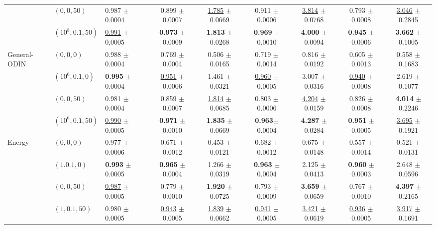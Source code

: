 \begin{table}[htb]
\begin{adjustbox}{width=1\textwidth,center}
\begin{tabular}{l|l|l|c|c|c|c|c|c}
			& $(0, 0, 50)$ & 0.987 $\pm$ 0.0004 & 0.899 $\pm$ 0.0007 & \underline{1.785} $\pm$ 0.0669 & 0.911 $\pm$ 0.0006 & \underline{3.814} $\pm$ 0.0768 & 0.793 $\pm$ 0.0008 & \underline{3.046} $\pm$ 0.2845\\
			& $(10^8, 0.1, 50)$ & \underline{0.991} $\pm$ 0,0005 & \textbf{0.973} $\pm$ 0.0009 & \textbf{1.813} $\pm$ 0.0268 & \textbf{0.969} $\pm$ 0.0010 & \textbf{4.000} $\pm$ 0.0094 & \textbf{0.945} $\pm$ 0.0006 & \textbf{3.662} $\pm$ 0.1005\\ \hline
            \multirow{4}{0.10\linewidth}{General-ODIN} 
			& $(0, 0, 0)$ & 0.988 $\pm$ 0.0004 & 0.769 $\pm$ 0.0004 & 0.506 $\pm$ 0.0165 & 0.719 $\pm$ 0.0014 & 0.816 $\pm$ 0.0192 & 0.605 $\pm$ 0.0013 & 0.558 $\pm$ 0.1683\\
			& $(10^6, 0.1, 0)$ & \textbf{0.995} $\pm$ 0.0004 & \underline{0.951} $\pm$ 0.0006 & 1.461 $\pm$ 0.0321 & \underline{0.960} $\pm$ 0.0005 & 3.007 $\pm$ 0.0316 & \underline{0.940} $\pm$ 0.0008 & 2.619 $\pm$ 0.1077\\
			& $(0, 0, 50)$ & 0.981 $\pm$ 0.0004 & 0.859 $\pm$ 0.0007 & \underline{1.814} $\pm$ 0.0685 & 0.803 $\pm$ 0.0006 & \underline{4.204} $\pm$ 0.0159 & 0.826 $\pm$ 0.0008 & \textbf{4.014} $\pm$ 0.2246\\
			& $(10^6, 0.1, 50)$ & \underline{0.990} $\pm$ 0.0005 & \textbf{0.971} $\pm$ 0.0010 & \textbf{1.835} $\pm$ 0.0669 & \textbf{0.963}$\pm$ 0.0004 & \textbf{4.287} $\pm$ 0.0284 & \textbf{0.951} $\pm$ 0.0005 & \underline{3.695} $\pm$ 0.1921 \\ \hline
            \multirow{4}{0.10\linewidth}{Energy} 
			& $(0, 0, 0)$ & 0.977 $\pm$ 0.0006 & 0.671 $\pm$ 0.0012 & 0.453 $\pm$ 0.0121 & 0.682 $\pm$ 0.0012 & 0.675 $\pm$ 0.0148 & 0.557 $\pm$ 0.0014 & 0.521 $\pm$ 0.0131\\
			& $(1. 0.1, 0)$ & \textbf{0.993} $\pm$ 0.0005 & \textbf{0.965} $\pm$ 0.0004 & 1.266 $\pm$ 0.0319 & \textbf{0.963} $\pm$ 0.0004 & 2.125 $\pm$ 0.0413 & \textbf{0.960} $\pm$ 0.0003 & 2.648 $\pm$ 0.0596\\
			& $(0, 0, 50)$ & \underline{0.987} $\pm$ 0.0005 & 0.779 $\pm$ 0.0010 & \textbf{1.920} $\pm$ 0.0725 & 0.793 $\pm$ 0.0009 & \textbf{3.659} $\pm$ 0.0659 & 0.767 $\pm$ 0.0010 & \textbf{4.397} $\pm$ 0.2165 \\
			& $(1, 0.1, 50)$ & 0.980 $\pm$ 0.0005 & \underline{0.943} $\pm$ 0.0005 & \underline{1.839} $\pm$ 0.0662 & \underline{0.941} $\pm$ 0.0005 & \underline{3.421} $\pm$ 0.0619 & \underline{0.936} $\pm$ 0.0005 & \underline{3.917} $\pm$ 0.1691 \\ \hline

\end{tabular}
\end{adjustbox}
\end{table}
